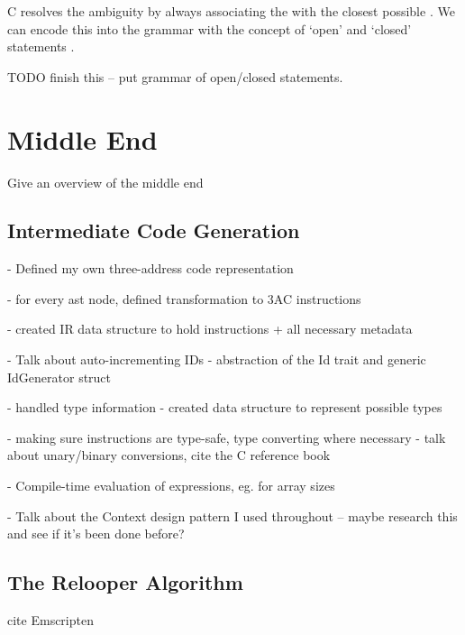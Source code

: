 \documentclass[00-main.tex]{subfiles}
\begin{document}
C resolves the ambiguity by always associating the  with the closest possible .
We can encode this into the grammar with the concept of `open' and `closed' statements .

\begin{Comment}
TODO finish this -- put grammar of open/closed statements.
\end{Comment}


\section{Middle End}

\begin{Comment}
Give an overview of the middle end
\end{Comment}

\subsection{Intermediate Code Generation}

\begin{Comment}
- Defined my own three-address code representation

- for every ast node, defined transformation to 3AC instructions

- created IR data structure to hold instructions + all necessary metadata

- Talk about auto-incrementing IDs - abstraction of the Id trait and generic IdGenerator struct

- handled type information - created data structure to represent possible types

- making sure instructions are type-safe, type converting where necessary - talk about unary/binary conversions, cite the C reference book

- Compile-time evaluation of expressions, eg. for array sizes

- Talk about the Context design pattern I used throughout -- maybe research this and see if it's been done before?
\end{Comment}

\subsection{The Relooper Algorithm}

\begin{Comment}
cite Emscripten \cite{emscripten}
\end{Comment}
\end{document}
